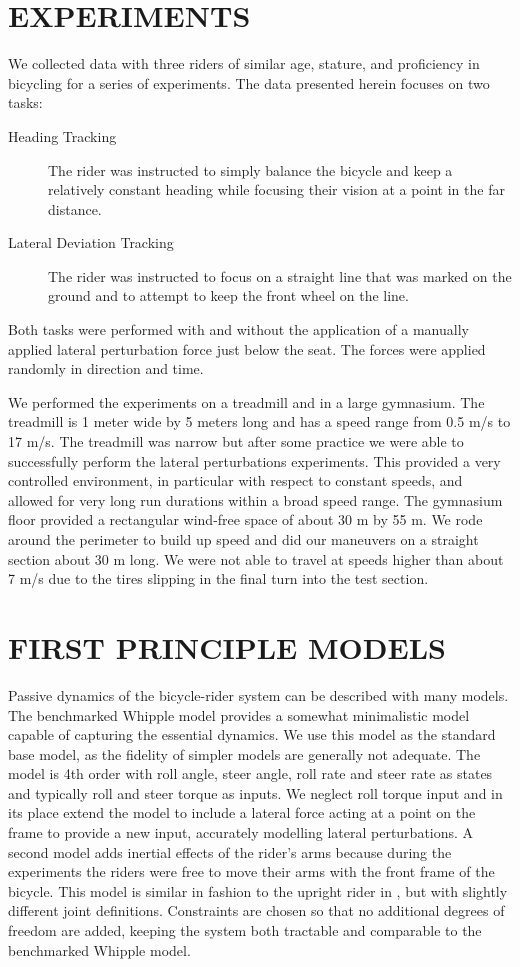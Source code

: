 \documentclass[twocolumn,10pt]{asme2e}
\begin{document}
\section*{EXPERIMENTS}
We collected data with three riders of similar age, stature, and proficiency in
bicycling for a series of experiments. The data presented herein focuses on
two tasks:
\begin{description}
	\item[Heading Tracking]
		The rider was instructed to simply balance the bicycle and keep a
		relatively constant heading while focusing their vision at a point in the
		far distance.
	\item[Lateral Deviation Tracking]
		The rider was instructed to focus on a straight line that was marked on the
		ground and to attempt to keep the front wheel on the line.
\end{description}

Both tasks were performed with and without the application of a manually
applied lateral perturbation force just below the seat. The forces were applied
randomly in direction and time.

We performed the experiments on a treadmill and in a large gymnasium. The
treadmill is 1 meter wide by 5 meters long and has a speed range from 0.5 m/s
to 17 m/s. The treadmill was narrow but after some practice we were able to
successfully perform the lateral perturbations experiments. This provided a
very controlled environment, in particular with respect to constant speeds, and
allowed for very long run durations within a broad speed range. The gymnasium
floor provided a rectangular wind-free space of about 30 m by 55 m. We rode
around the perimeter to build up speed and did our maneuvers on a straight
section about 30 m long. We were not able to travel at speeds higher than about
7 m/s due to the tires slipping in the final turn into the test section.
%
\section*{FIRST PRINCIPLE MODELS}
Passive dynamics of the bicycle-rider system can be described with many models.
The benchmarked \cite{Meijaard2007,Basu-Mandal2007} Whipple model
\cite{Whipple1899} provides a somewhat minimalistic model capable of capturing
the essential dynamics. We use this model as the standard base model, as the
fidelity of simpler models are generally not adequate. The model is 4th order
with roll angle, steer angle, roll rate and steer rate as states and typically
roll and steer torque as inputs. We neglect roll torque input and in its place
extend the model to include a lateral force acting at a point on the frame to
provide a new input, accurately modelling lateral perturbations. A second model
adds inertial effects of the rider's arms because during the experiments the
riders were free to move their arms with the front frame of the bicycle. This
model is similar in fashion to the upright rider in \cite{Schwab2012}, but with
slightly different joint definitions.  Constraints are chosen so that no
additional degrees of freedom are added, keeping the system both tractable and
comparable to the benchmarked Whipple model.
\end{document}
